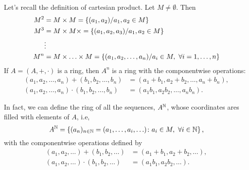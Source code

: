 \documentclass[11pt,a4paper]{article}
\begin{document}
\begin{exa}
Let's recall the definition of cartesian product. Let $M\neq \emptyset$. Then 
\begin{align*}
    M^2&=M\times M=\left\lbrace (a_1,a_2)/ a_1,a_2\in M \right\rbrace\\
    M^3&=M\times M\times =\left\lbrace (a_1,a_2,a_3)/ a_1,a_2\in M \right\rbrace\\
    &\vdots\\
    M^n&=M\times \ldots\times M=\left\lbrace (a_1,a_2,\ldots,a_n)/ a_i\in M,\,\,\forall i=1,\ldots,n \right\rbrace
\end{align*}
If $A=(A,+,\cdot)$ is a ring, then $A^n$ is a ring with the componentwise operations:
\begin{align*}
    (a_1,a_2,\ldots,a_n)+(b_1,b_2,\ldots,b_n)&=(a_1+b_1,a_2+b_2,\ldots,a_n+b_n),\\
(a_1,a_2,\ldots,a_n)\cdot(b_1,b_2,\ldots,b_n)&=(a_1b_1,a_2b_2,\ldots,a_nb_n).
\end{align*}

In fact, we can define the ring of all the sequences, $A^{\mathbb{N}}$, whose coordinates ares filled with elements of $A$, i.e, 
\[A^{\mathbb{N}}=\left\lbrace (a_n)_{n\in \mathbb{N}}=(a_1,\ldots,a_i,\ldots)\colon a_i\in M,\,\,\forall i\in\mathbb{N} \right\rbrace,\]
with the componentwise operations defined by
\begin{align*}
    (a_1,a_2,\ldots)+(b_1,b_2,\ldots)&=(a_1+b_1,a_2+b_2,\ldots),\\
(a_1,a_2,\ldots)\cdot(b_1,b_2,\ldots)&=(a_1b_1,a_2b_2,\ldots).
\end{align*}
\end{exa}
\end{document}
